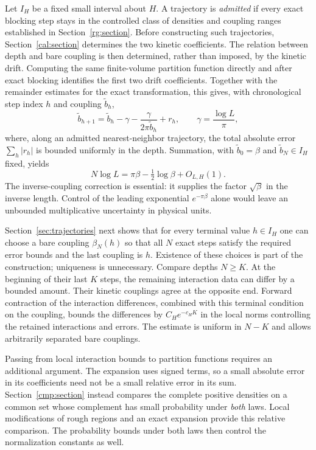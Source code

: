 Let $I_H$ be a fixed small interval about $H$. A trajectory is
\emph{admitted} if every exact blocking step stays in the controlled
class of densities and coupling ranges established in
Section~\ref{rg:section}. Before constructing such trajectories,
Section~\ref{cal:section} determines the two kinetic coefficients.
The relation between depth and bare coupling is then determined, rather
than imposed, by the kinetic drift. Computing the same finite-volume
partition function directly and after exact blocking identifies the
first two drift coefficients. Together with the remainder estimates
for the exact transformation, this gives, with chronological step index $h$
and coupling $\widetilde b_h$,
\[
 \widetilde b_{h+1}=\widetilde b_h-\gamma-\frac{\gamma}{2\pi\widetilde b_h}+r_h,
 \qquad \gamma=\frac{\log L}{\pi},
\]
where, along an admitted nearest-neighbor trajectory, the total absolute
error $\sum_h|r_h|$ is bounded uniformly in the depth. Summation,
with $\widetilde b_0=\beta$ and $\widetilde b_N\in I_H$ fixed, yields
\begin{equation}
 N\log L=\pi\beta-\tfrac12\log\beta+O_{L,H}(1).
 \label{intro:calibration}
\end{equation}
The inverse-coupling correction is essential: it supplies the factor
$\sqrt\beta$ in the inverse length. Control of the leading exponential
$e^{-\pi\beta}$ alone would leave an unbounded multiplicative
uncertainty in physical units.

Section~\ref{sec:trajectories} next shows that for every terminal value
$h\in I_H$ one can choose a bare coupling $\beta_N(h)$ so that all $N$ exact steps satisfy the
required error bounds and the last coupling is $h$. Existence of these
choices is part of the construction; uniqueness is unnecessary. Compare depths $N\ge K$.
At the beginning of their last $K$ steps, the remaining interaction
data can differ by a bounded amount. Their kinetic couplings agree at
the opposite end. Forward contraction of the interaction differences,
combined with this terminal condition on the coupling, bounds the
differences by $C_He^{-c_HK}$ in the local norms controlling the
retained interactions and errors. The estimate is uniform in
$N-K$ and allows arbitrarily separated bare couplings.

Passing from local interaction bounds to partition functions requires
an additional argument. The expansion uses signed terms, so a small
absolute error in its coefficients need not be a small relative error
in its sum. Section~\ref{cmp:section} instead compares the complete
positive densities on a common set whose complement has small
probability under \emph{both} laws. Local modifications of rough
regions and an exact expansion provide this relative comparison.
The probability bounds under both laws then control the normalization
constants as well.

